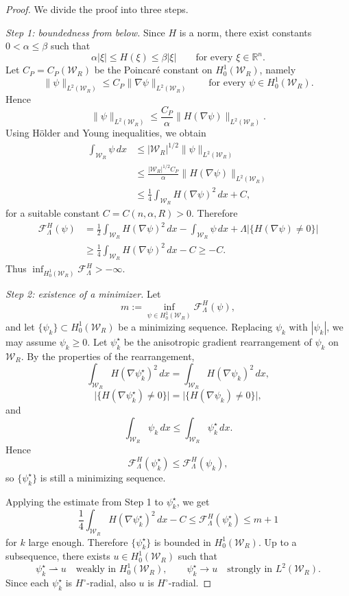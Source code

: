 \documentclass[oneside,a4paper,12pt,notitlepage]{article}
\theoremstyle{definition}
\newcommand{\R}{\mathbb{R}}
\newcommand{\W}{\mathcal{W}}
\begin{document}
\begin{proof}
We divide the proof into three steps.

\medskip
\noindent
\textit{Step 1: boundedness from below.}
Since $H$ is a norm, there exist constants $0<\alpha\le \beta$ such that
\[
\alpha |\xi|\le H(\xi)\le \beta |\xi|
\qquad\text{for every }\xi\in\R^n.
\]
Let $C_P=C_P(\W_R)$ be the Poincar\'e constant on $H_0^1(\W_R)$, namely
\[
\|\psi\|_{L^2(\W_R)}\le C_P \|\nabla\psi\|_{L^2(\W_R)}
\qquad\text{for every }\psi\in H_0^1(\W_R).
\]
Hence
\[
\|\psi\|_{L^2(\W_R)}
\le \frac{C_P}{\alpha}\|H(\nabla\psi)\|_{L^2(\W_R)}.
\]
Using H\"older and Young inequalities, we obtain
\begin{align*}
\int_{\W_R}\psi\,dx
&\le |\W_R|^{1/2}\|\psi\|_{L^2(\W_R)}\\
&\le \frac{|\W_R|^{1/2}C_P}{\alpha}\|H(\nabla\psi)\|_{L^2(\W_R)}\\
&\le \frac14\int_{\W_R}H(\nabla\psi)^2\,dx + C,
\end{align*}
for a suitable constant $C=C(n,\alpha,R)>0$.
Therefore
\begin{align*}
\mathcal F^H_\Lambda(\psi)
&=\frac12\int_{\W_R}H(\nabla\psi)^2\,dx-\int_{\W_R}\psi\,dx
+\Lambda |\{H(\nabla\psi)\neq 0\}|\\
&\ge \frac14\int_{\W_R}H(\nabla\psi)^2\,dx - C
\ge -C.
\end{align*}
Thus $\inf_{H_0^1(\W_R)}\mathcal F^H_\Lambda>-\infty$.

\medskip
\noindent
\textit{Step 2: existence of a minimizer.}
Let
\[
m:=\inf_{\psi\in H_0^1(\W_R)} \mathcal F^H_\Lambda(\psi),
\]
and let $\{\psi_k\}\subset H_0^1(\W_R)$ be a minimizing sequence.
Replacing $\psi_k$ with $|\psi_k|$, we may assume $\psi_k\ge 0$.
Let $\psi_k^\star$ be the anisotropic gradient rearrangement of $\psi_k$ on $\W_R$.
By the properties of the rearrangement,
\[
\int_{\W_R}H(\nabla\psi_k^\star)^2\,dx
=
\int_{\W_R}H(\nabla\psi_k)^2\,dx,
\]
\[
\big|\{H(\nabla\psi_k^\star)\neq 0\}\big|
=
\big|\{H(\nabla\psi_k)\neq 0\}\big|,
\]
and
\[
\int_{\W_R}\psi_k\,dx\le \int_{\W_R}\psi_k^\star\,dx.
\]
Hence
\[
\mathcal F^H_\Lambda(\psi_k^\star)\le \mathcal F^H_\Lambda(\psi_k),
\]
so $\{\psi_k^\star\}$ is still a minimizing sequence.

Applying the estimate from Step 1 to $\psi_k^\star$, we get
\[
\frac14\int_{\W_R}H(\nabla\psi_k^\star)^2\,dx - C
\le \mathcal F^H_\Lambda(\psi_k^\star)\le m+1
\]
for $k$ large enough. Therefore $\{\psi_k^\star\}$ is bounded in $H_0^1(\W_R)$.
Up to a subsequence, there exists $u\in H_0^1(\W_R)$ such that
\[
\psi_k^\star \rightharpoonup u \quad\text{weakly in }H_0^1(\W_R),
\qquad
\psi_k^\star \to u \quad\text{strongly in }L^2(\W_R).
\]
Since each $\psi_k^\star$ is $H^\circ$-radial, also $u$ is $H^\circ$-radial.


\end{proof}
\end{document}
